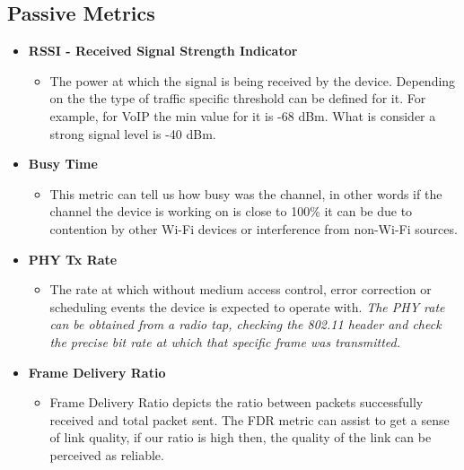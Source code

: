 \subsection*{Passive Metrics}

\begin{itemize}
	\item \textbf{RSSI - Received Signal Strength Indicator}
	\begin{itemize}
		\item The power at which the signal is being received by the device. Depending on the the type of traffic specific threshold can be defined for it. For example, for VoIP the min value for it is -68 dBm. What is consider a strong signal level is -40 dBm.
	\end{itemize}

	\item \textbf{Busy Time}
	\begin{itemize}
		\item This metric can tell us how busy was the channel, in other words if the channel the device is working on is close to 100\% it can be due to contention by other Wi-Fi devices or interference from non-Wi-Fi sources.
	\end{itemize}
	
	\item \textbf{PHY Tx Rate}
	\begin{itemize}
		\item 	The rate at which without medium access control, error correction or scheduling events the device is expected to operate with.
		\emph{The PHY rate can be obtained from a radio tap, checking the 802.11 header and check the precise bit rate at which that specific frame was transmitted.}
	\end{itemize}
	
	\item \textbf{Frame Delivery Ratio}
	\begin{itemize}
		\item Frame Delivery Ratio depicts the ratio between packets successfully received and total packet sent. The FDR metric can assist to get a sense of link quality, if our ratio is high then, the quality of the link can be perceived as reliable.
	\end{itemize}

\end{itemize}

